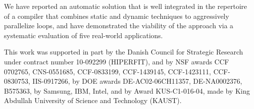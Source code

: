 \documentclass[10pt,nocopyrightspace]{sigplanconf}
\begin{document}
We have reported an automatic solution that is well integrated 
in the repertoire of a compiler that combines static and dynamic 
techniques to aggressively parallelize loops, and have 
demonstrated the viability of the approach via a systematic
evaluation of five real-world applications.

   

\acks 
   
This work was supported in part by
the Danish Council for Strategic Research under contract number 10-092299 (HIPERFIT), 
and by 
NSF awards
CCF 0702765, %
CNS-0551685, %
CCF-0833199, %
CCF-1439145, %
CCF-1423111, %
CCF-0830753, %
IIS-0917266, %
by DOE awards
DE-AC02-06CH11357, %
DE-NA0002376, %
B575363,  %
by Samsung, IBM, Intel, and
by Award KUS-C1-016-04, made by King Abdullah University of Science and Technology (KAUST).







\end{document}

